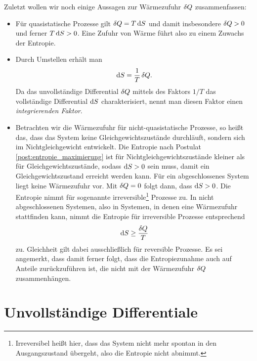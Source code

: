 Zuletzt wollen wir noch einige Aussagen zur Wärmezufuhr $\mathop{}\!\delta Q$ zusammenfassen:
\begin{itemize}
    \item Für quasistatische Prozesse gilt $\mathop{}\!\delta Q=T\mathop{}\!\mathrm{d} S$ und damit insbesondere $\mathop{}\!\delta Q>0$ und ferner $T\mathop{}\!\mathrm{d} S>0$. Eine Zufuhr von Wärme führt also zu einem Zuwachs der Entropie.
    \item Durch Umstellen erhält man
          \begin{align*}
              \mathop{}\!\mathrm{d} S = \frac{1}{T}\mathop{}\!\delta Q.
          \end{align*}
          Da das unvollständige Differential $\mathop{}\!\delta Q$ mittels des Faktors $1/T$ das vollständige Differential $\mathop{}\!\mathrm{d} S$ charakterisiert, nennt man diesen Faktor einen \emph{integrierenden Faktor}.
    \item Betrachten wir die Wärmezufuhr für nicht-quasistatische Prozesse, so heißt das, dass das System keine Gleichgewichtszustände durchläuft, sondern sich im Nichtgleichgewicht entwickelt. Die Entropie nach Postulat \ref{post:entropie_maximierung} ist für Nichtgleichgewichtszustände kleiner als für Gleichgewichtszustände, sodass $\mathop{}\!\mathrm{d} S > 0$ sein muss, damit ein Gleichgewichtszustand erreicht werden kann.
          Für ein abgeschlossenes System liegt keine Wärmezufuhr vor. Mit $\mathop{}\!\delta Q=0$ folgt dann, dass  $\mathop{}\!\mathrm{d} S >0$. Die Entropie nimmt für sogenannte irreversible\footnote{Irreversibel heißt hier, dass das System nicht mehr spontan in den Ausgangszustand übergeht, also die Entropie nicht abnimmt.} Prozesse zu. In nicht abgeschlossenen Systemen, also in Systemen, in denen eine Wärmezufuhr stattfinden kann, nimmt die Entropie für irreversible Prozesse entsprechend
          \begin{align*}
              \mathop{}\!\mathrm{d} S\geq \frac{\mathop{}\!\delta Q}{T}
          \end{align*}
          zu.
          Gleichheit gilt dabei ausschließlich für reversible Prozesse. Es sei angemerkt, dass damit ferner folgt, dass die Entropiezunahme auch auf Anteile zurückzuführen ist, die nicht mit der Wärmezufuhr $\mathop{}\!\delta Q$ zusammenhängen.
\end{itemize}

\section{Unvollständige Differentiale}

